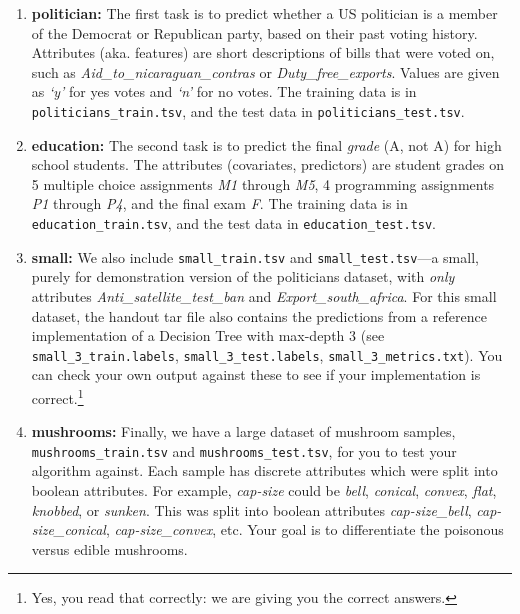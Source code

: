\documentclass[11pt,addpoints,answers]{exam}
\begin{document}
\begin{enumerate}
\item \textbf{politician:}
    The first task is to predict whether a US politician is a member of the Democrat or Republican party, based on their past voting history. Attributes (aka. features) are short descriptions of bills that were voted on, such as \emph{Aid\_to\_nicaraguan\_contras} or \emph{Duty\_free\_exports}. Values are given as \emph{`y'} for yes votes and \emph{`n'} for no votes. The training data is in \lstinline{politicians_train.tsv}, and the test data in \lstinline{politicians_test.tsv}.
\item \textbf{education:}
    The second task is to predict the final \emph{grade} (A, not A) for high school students. The attributes (covariates, predictors) are student grades on 5 multiple choice assignments \emph{M1} through \emph{M5}, 4 programming assignments \emph{P1} through \emph{P4}, and the final exam \emph{F}. The training data is in \newline \lstinline{education_train.tsv}, and the test data in \lstinline{education_test.tsv}.
\item \textbf{small:}
    We also include \lstinline{small_train.tsv} and \lstinline{small_test.tsv}---a small, purely for demonstration version of the politicians dataset, with \emph{only} attributes \emph{Anti\_satellite\_test\_ban} and \newline \emph{Export\_south\_africa}.  
    For this small dataset, the handout tar file also contains the predictions from a reference implementation of a Decision Tree with max-depth 3 (see \lstinline{small_3_train.labels}, \lstinline{small_3_test.labels}, \lstinline{small_3_metrics.txt}).
    You can check your own output against these to see if your implementation is correct.\footnote{Yes, you read that correctly: we are giving you the correct answers.}
\item \textbf{mushrooms:}
    Finally, we have a large dataset of mushroom samples, \lstinline{mushrooms_train.tsv} and \lstinline{mushrooms_test.tsv},
    for you to test your algorithm against.
    Each sample has discrete attributes which were split into boolean attributes. For example, \emph{cap-size} could be  \emph{bell}, \emph{conical}, \emph{convex}, \emph{flat}, \emph{knobbed}, or \emph{sunken}. This was split into boolean attributes \emph{cap-size\_bell}, \emph{cap-size\_conical},  \emph{cap-size\_convex}, etc.
    Your goal is to differentiate the poisonous versus edible mushrooms.
\end{enumerate}
\end{document}
